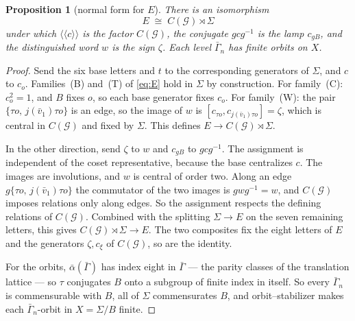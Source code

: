 \documentclass[11pt]{amsart}
\newcommand{\leanverified}[2]{\ignorespaces}
\newtheorem{proposition}[theorem]{Proposition}
\theoremstyle{definition}
\theoremstyle{remark}
\theoremstyle{plain}
\begin{document}
\begin{proposition}[normal form for $E$]\label{prop:blocknormalform}
There is an isomorphism
\[
 E\;\cong\;C(\mathcal G)\rtimes\Sigma
\]
under which $\langle\!\langle c\rangle\!\rangle$ is the factor
$C(\mathcal G)$, the conjugate $gcg^{-1}$ is the lamp $c_{gB}$, and the
distinguished word $w$ is the sign $\zeta$.  Each level $\bar\Gamma_n$ has
finite orbits on $X$.
\leanverified{Sofic/LiteralBlockNormalForm}{GroupApproximation.LiteralBlockNormalForm.markedGroupEquivModel}
\leanverified{Sofic/LiteralBlockNormalForm}{GroupApproximation.LiteralBlockNormalForm.lampKernelEquiv}
\leanverified{Sofic/LiteralBlockNormalForm}{GroupApproximation.LiteralBlockNormalForm.manuscriptSiteLampImage}
\leanverified{Sofic/LiteralBlockNormalForm}{GroupApproximation.LiteralBlockNormalForm.toModel_mark}
\leanverified{Sofic/LiteralBlockNormalForm}{GroupApproximation.LiteralBlockNormalForm.manuscriptFiniteLevelSiteOrbit}
\leanverified{Sofic/LiteralVerticalBridge}{GroupApproximation.LiteralVerticalBridge.verticalEquiv}
\end{proposition}

\begin{proof}
Send the six base letters and $t$ to the corresponding generators of
$\Sigma$, and $c$ to $c_o$.  Families~\textup{(B)} and~\textup{(T)} of
\eqref{eq:E} hold in $\Sigma$ by construction.  For family~\textup{(C)}:
$c_o^2=1$, and $B$ fixes $o$, so each base generator fixes $c_o$.  For
family~\textup{(W)}: the pair $\{\tau o,\,j(\bar v_1)\tau o\}$ is an
edge, so the image of $w$ is
$[c_{\tau o},c_{j(\bar v_1)\tau o}]=\zeta$, which is central in
$C(\mathcal G)$ and fixed by $\Sigma$.  This defines
$E\to C(\mathcal G)\rtimes\Sigma$.

In the other direction, send $\zeta$ to $w$ and $c_{gB}$ to
$gcg^{-1}$.  The assignment is independent of the coset representative,
because the base centralizes $c$.  The images are involutions, and $w$
is central of order two.  Along an edge
$g\{\tau o,\,j(\bar v_1)\tau o\}$ the commutator of the two images is
$gwg^{-1}=w$, and $C(\mathcal G)$ imposes relations only along edges.
So the assignment respects the defining relations of
$C(\mathcal G)$.
Combined with the splitting $\Sigma\to E$ on the seven
remaining letters, this gives $C(\mathcal G)\rtimes\Sigma\to E$.  The
two composites fix the eight letters of $E$ and the generators
$\zeta,c_\xi$ of $C(\mathcal G)$, so are the identity.

For the orbits, $\bar\alpha(\bar\Gamma)$ has index eight in
$\bar\Gamma$ --- the parity classes of the translation lattice --- so
$\tau$ conjugates $B$ onto a subgroup of finite index in itself.  So every
$\bar\Gamma_n$ is commensurable with $B$, all of $\Sigma$
commensurates $B$, and orbit--stabilizer makes each $\bar\Gamma_n$-orbit in
$X=\Sigma/B$ finite.
\end{proof}
\end{document}
